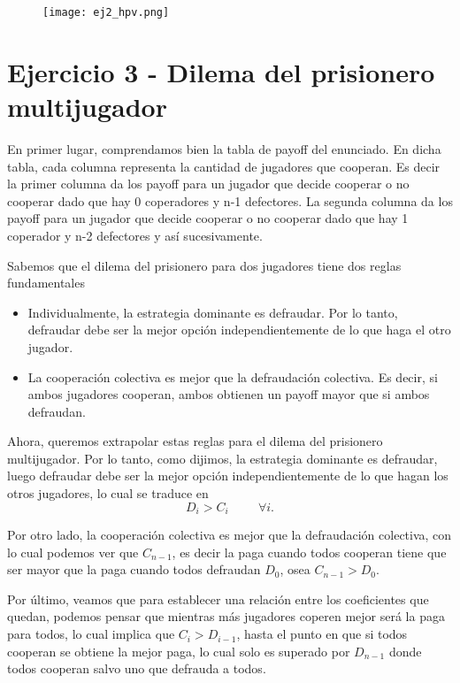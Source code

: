 \documentclass[letterpaper,12pt]{article}
\theoremstyle{plain}
\begin{document}
\begin{figure}[h]
    \centering
    \texttt{[image: ej2\_hpv.png]}
    \caption{} 
    \label{fig:ej2_hpv}
\end{figure}

\section*{Ejercicio 3 - Dilema del prisionero multijugador}

En primer lugar, comprendamos bien la tabla de payoff del enunciado. En dicha tabla, cada columna representa la cantidad de jugadores que cooperan. Es decir la primer columna da los payoff para un jugador que decide cooperar o no cooperar dado que hay 0 coperadores y n-1 defectores. La segunda columna da los payoff para un jugador que decide cooperar o no cooperar dado que hay 1 coperador y n-2 defectores y así sucesivamente. 

Sabemos que el dilema del prisionero para dos jugadores tiene dos reglas fundamentales
\begin{itemize}
    \item Individualmente, la estrategia dominante es defraudar. Por lo tanto, defraudar debe ser la mejor opción independientemente de lo que haga el otro jugador.
    \item La cooperación colectiva es mejor que la defraudación colectiva. Es decir, si ambos jugadores cooperan, ambos obtienen un payoff mayor que si ambos defraudan.
\end{itemize}

Ahora, queremos extrapolar estas reglas para el dilema del prisionero multijugador. Por lo tanto, como dijimos, la estrategia dominante es defraudar, luego defraudar debe ser la mejor opción independientemente de lo que hagan los otros jugadores, lo cual se traduce en 
\begin{equation}
    D_i > C_i \hspace{1cm} \forall i.
\end{equation}

Por otro lado, la cooperación colectiva es mejor que la defraudación colectiva, con lo cual podemos ver que $C_{n-1}$, es decir la paga cuando todos cooperan tiene que ser mayor que la paga cuando todos defraudan $D_0$, osea $C_{n-1} > D_0$.

Por último, veamos que para establecer una relación entre los coeficientes que quedan, podemos pensar que mientras más jugadores coperen mejor será la paga para todos, lo cual implica que $C_i > D_{i-1}$, hasta el punto en que si todos cooperan se obtiene la mejor paga, lo cual solo es superado por $D_{n-1}$ donde todos cooperan salvo uno que defrauda a todos.
\end{document}
